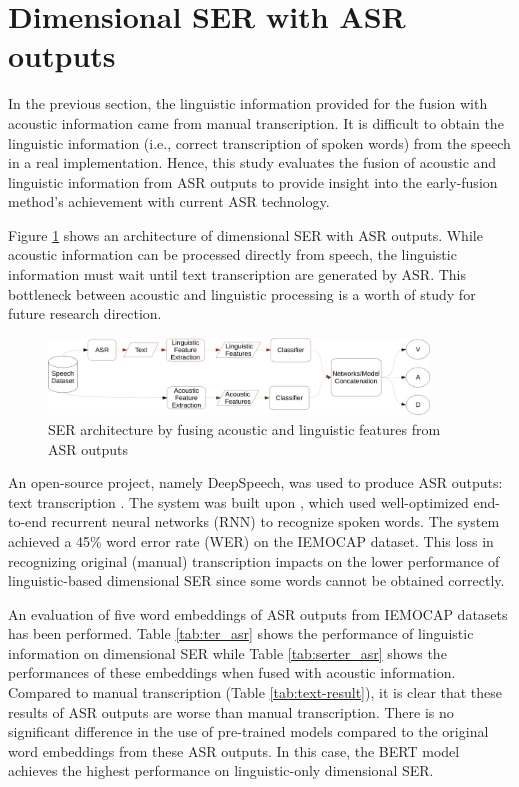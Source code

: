 
\section{Dimensional SER with ASR outputs}
In the previous section, the linguistic information provided for the fusion
with acoustic information came from manual transcription. It is difficult to
obtain the linguistic information (i.e., correct transcription of spoken words)
from the speech in a real implementation. Hence, this study evaluates the
fusion of acoustic and linguistic information from ASR outputs to provide
insight into the early-fusion method's achievement with current ASR technology.

Figure \ref{fig:ser_asr} shows an architecture of dimensional SER with ASR
outputs. While acoustic information can be processed directly from speech, the
linguistic information must wait until text transcription are generated by ASR.
This bottleneck between acoustic and linguistic processing is a worth of study
for future research direction.
\begin{figure}[htbp]
  \centering
  \includegraphics[width=0.9\textwidth]{../fig/ser_asr-crop.pdf}
  \caption{SER architecture by fusing acoustic and linguistic features from ASR outputs}
  \label{fig:ser_asr}
\end{figure}

An open-source project, namely DeepSpeech, was used to produce ASR outputs:
text transcription \cite{DeepSpeech2019}. The system was built upon
\cite{Hannun2014}, which used well-optimized end-to-end recurrent neural
networks (RNN) to recognize spoken words. The system achieved a 45\% word error
rate (WER) on the IEMOCAP dataset. This loss in recognizing original (manual)
transcription impacts on the lower performance of linguistic-based dimensional
SER since some words cannot be obtained correctly.

An evaluation of five word embeddings of ASR outputs from IEMOCAP datasets has
been performed. Table \ref{tab:ter_asr} shows the performance of linguistic
information on dimensional SER while Table \ref{tab:serter_asr} shows the
performances of these embeddings when fused with acoustic information. Compared
to manual transcription (Table \ref{tab:text-result}), it is clear that these
results of ASR outputs are worse than manual transcription. There is no
significant difference in the use of pre-trained models compared to the
original word embeddings from these ASR outputs. In this case, the BERT model
achieves the highest performance on linguistic-only dimensional SER.

